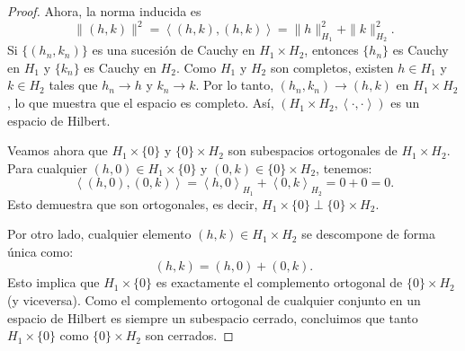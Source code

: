 \documentclass{article}
\theoremstyle{definition}
\newcommand{\ip}[2]{\left\langle #1, #2 \right\rangle}   %
\begin{document}
\begin{proof}
	Ahora, la norma inducida es
	\[
		\|(h, k)\|^2 = \ip{(h, k)}{(h, k)} = \|h\|_{H_1}^2 + \|k\|_{H_2}^2.
	\]
	Si \( \{(h_n, k_n)\} \) es una sucesión de Cauchy en \( H_1 \times H_2 \), entonces \( \{h_n\} \) es Cauchy en \( H_1 \) y \( \{k_n\} \) es Cauchy en \( H_2 \). Como \( H_1 \) y \( H_2 \) son completos, existen \( h \in H_1 \) y \( k \in H_2 \) tales que \( h_n \to h \) y \( k_n \to k \). Por lo tanto, \( (h_n, k_n) \to (h, k) \) en \( H_1 \times H_2 \), lo que muestra que el espacio es completo.
	Así, \( (H_1 \times H_2, \ip{\cdot}{\cdot}) \) es un espacio de Hilbert.

	Veamos ahora que \( H_1 \times \{ 0 \} \) y \( \{ 0 \} \times H_2 \) son subespacios ortogonales de \( H_1 \times H_2 \). Para cualquier \( (h, 0) \in H_1 \times \{ 0 \} \) y \( (0, k) \in \{ 0 \} \times H_2 \), tenemos:
	\[
		\ip{(h, 0)}{(0, k)} = \ip{h}{0}_{H_1} + \ip{0}{k}_{H_2} = 0 + 0 = 0.
	\]
	Esto demuestra que son ortogonales, es decir, \( H_1 \times \{ 0 \} \perp \{ 0 \} \times H_2 \).

	Por otro lado, cualquier elemento \( (h, k) \in H_1 \times H_2 \) se descompone de forma única como:
	\[
		(h, k) = (h, 0) + (0, k).
	\]
	Esto implica que \( H_1 \times \{ 0 \} \) es exactamente el complemento ortogonal de \( \{ 0 \} \times H_2 \) (y viceversa). Como el complemento ortogonal de cualquier conjunto en un espacio de Hilbert es siempre un subespacio cerrado, concluimos que tanto \( H_1 \times \{ 0 \} \) como \( \{ 0 \} \times H_2 \) son cerrados.
\end{proof}

\vspace{0.5cm}
\end{document}

